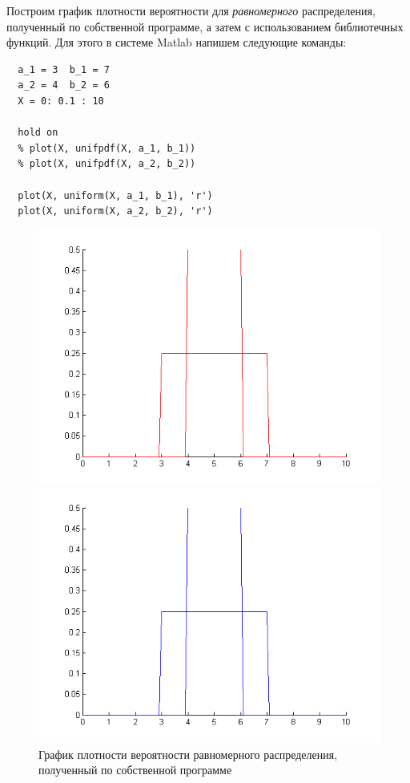 Построим график плотности вероятности для \textit{равномерного} распределения,
полученный по собственной программе, а затем с использованием библиотечных функций.
Для этого в системе Matlab напишем следующие команды:

\begin{lstlisting}
  a_1 = 3  b_1 = 7
  a_2 = 4  b_2 = 6
  X = 0: 0.1 : 10

  hold on
  % plot(X, unifpdf(X, a_1, b_1))
  % plot(X, unifpdf(X, a_2, b_2))

  plot(X, uniform(X, a_1, b_1), 'r')
  plot(X, uniform(X, a_2, b_2), 'r')
\end{lstlisting}

\begin{figure}[h]
  \begin{minipage}[h]{0.47\linewidth}
    \includegraphics[width=1\linewidth]{pic/uniform_our}
    \caption{График плотности вероятности равномерного распределения, полученный по собственной программе}
  \end{minipage}
  \hfill
  \begin{minipage}[h]{0.47\linewidth}
    \vspace{4mm}
    \includegraphics[width=1\linewidth]{pic/uniform_lib}

\end{minipage}
\end{figure}
